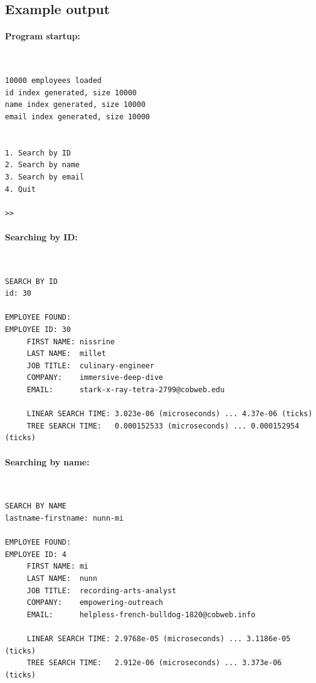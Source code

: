 \documentclass[a4paper,12pt,oneside]{book}
\begin{document}
    \subsection{Example output}

    \paragraph{Program startup:} ~\\
    
    \begin{lstlisting}[style=output]
10000 employees loaded
id index generated, size 10000
name index generated, size 10000
email index generated, size 10000


1. Search by ID
2. Search by name
3. Search by email
4. Quit

>>
    \end{lstlisting}

    \paragraph{Searching by ID:} ~\\

    \begin{lstlisting}[style=output]
SEARCH BY ID
id: 30

EMPLOYEE FOUND:
EMPLOYEE ID: 30
	 FIRST NAME: nissrine
	 LAST NAME:  millet
	 JOB TITLE:  culinary-engineer
	 COMPANY:    immersive-deep-dive
	 EMAIL:      stark-x-ray-tetra-2799@cobweb.edu

	 LINEAR SEARCH TIME: 3.023e-06 (microseconds) ... 4.37e-06 (ticks)
	 TREE SEARCH TIME:   0.000152533 (microseconds) ... 0.000152954 (ticks)

    \end{lstlisting}
    
    \paragraph{Searching by name:} ~\\

    \begin{lstlisting}[style=output]
SEARCH BY NAME
lastname-firstname: nunn-mi

EMPLOYEE FOUND:
EMPLOYEE ID: 4
	 FIRST NAME: mi
	 LAST NAME:  nunn
	 JOB TITLE:  recording-arts-analyst
	 COMPANY:    empowering-outreach
	 EMAIL:      helpless-french-bulldog-1820@cobweb.info

	 LINEAR SEARCH TIME: 2.9768e-05 (microseconds) ... 3.1186e-05 (ticks)
	 TREE SEARCH TIME:   2.912e-06 (microseconds) ... 3.373e-06 (ticks)
    \end{lstlisting}
    
\end{document}
